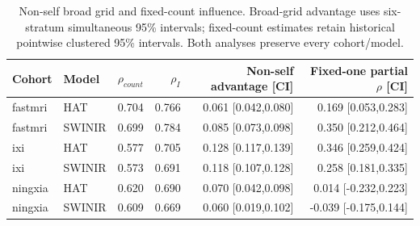 \begin{table}[t]\centering\small
\caption{Non-self broad grid and fixed-count influence. Broad-grid advantage uses six-stratum simultaneous 95\% intervals; fixed-count estimates retain historical pointwise clustered 95\% intervals. Both analyses preserve every cohort/model.}\label{tab:neural}
\begin{tabular}{llrrrr}\toprule
Cohort & Model & $\rho_{count}$ & $\rho_I$ & Non-self advantage [CI] & Fixed-one partial $\rho$ [CI]\\\midrule
fastmri & HAT & 0.704 & 0.766 & 0.061 [0.042,0.080] & 0.169 [0.053,0.283]\\
fastmri & SWINIR & 0.699 & 0.784 & 0.085 [0.073,0.098] & 0.350 [0.212,0.464]\\
ixi & HAT & 0.577 & 0.705 & 0.128 [0.117,0.139] & 0.346 [0.259,0.424]\\
ixi & SWINIR & 0.573 & 0.691 & 0.118 [0.107,0.128] & 0.258 [0.181,0.335]\\
ningxia & HAT & 0.620 & 0.690 & 0.070 [0.042,0.098] & 0.014 [-0.232,0.223]\\
ningxia & SWINIR & 0.609 & 0.669 & 0.060 [0.019,0.102] & -0.039 [-0.175,0.144]\\
\bottomrule\end{tabular}\end{table}
